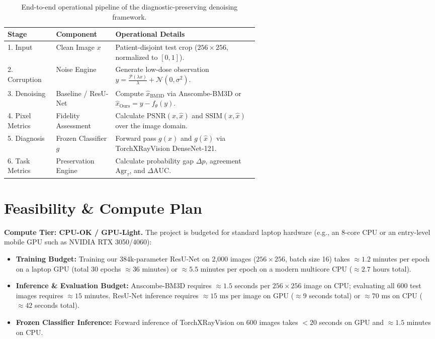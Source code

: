 \documentclass[11pt]{article}
\begin{document}
\begin{table}[t]
\centering
\small
\caption{End-to-end operational pipeline of the diagnostic-preserving denoising framework.}
\label{tab:pipeline}
\begin{tabular}{@{}llp{0.58\linewidth}@{}}
\toprule
\textbf{Stage} & \textbf{Component} & \textbf{Operational Details} \\
\midrule
1. Input & Clean Image $x$ & Patient-disjoint test crop ($256 \times 256$, normalized to $[0, 1]$). \\
2. Corruption & Noise Engine & Generate low-dose observation $y = \frac{\mathcal{P}(\lambda x)}{\lambda} + \mathcal{N}(0, \sigma^2)$. \\
3. Denoising & Baseline / ResU-Net & Compute $\hat{x}_{\mathrm{BM3D}}$ via Anscombe-BM3D or $\hat{x}_{\mathrm{Ours}} = y - f_\theta(y)$. \\
4. Pixel Metrics & Fidelity Assessment & Calculate $\mathrm{PSNR}(x, \hat{x})$ and $\mathrm{SSIM}(x, \hat{x})$ over the image domain. \\
5. Diagnosis & Frozen Classifier $g$ & Forward pass $g(x)$ and $g(\hat{x})$ via TorchXRayVision DenseNet-121. \\
6. Task Metrics & Preservation Engine & Calculate probability gap $\Delta p$, agreement $\mathrm{Agr}_\tau$, and $\Delta \mathrm{AUC}$. \\
\bottomrule
\end{tabular}
\end{table}

\section{Feasibility \& Compute Plan}
\label{sec:feasibility}
\textbf{Compute Tier: CPU-OK / GPU-Light.} The project is budgeted for standard laptop hardware (e.g., an 8-core CPU or an entry-level mobile GPU such as NVIDIA RTX 3050/4060):
\begin{itemize}[leftmargin=*,noitemsep]
  \item \textbf{Training Budget:} Training our 384k-parameter ResU-Net on 2{,}000 images ($256 \times 256$, batch size 16) takes $\approx 1.2$ minutes per epoch on a laptop GPU (total 30 epochs $\approx 36$ minutes) or $\approx 5.5$ minutes per epoch on a modern multicore CPU ($\approx 2.7$ hours total).
  \item \textbf{Inference \& Evaluation Budget:} Anscombe-BM3D requires $\approx 1.5$ seconds per $256 \times 256$ image on CPU; evaluating all 600 test images requires $\approx 15$ minutes. ResU-Net inference requires $\approx 15\text{ ms}$ per image on GPU ($\approx 9$ seconds total) or $\approx 70\text{ ms}$ on CPU ($\approx 42$ seconds total).
  \item \textbf{Frozen Classifier Inference:} Forward inference of TorchXRayVision on 600 images takes $<20$ seconds on GPU and $\approx 1.5$ minutes on CPU.
\end{itemize}
\end{document}
